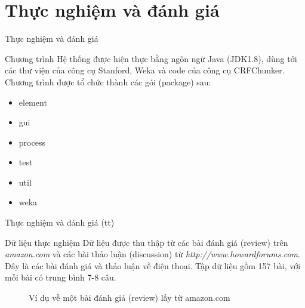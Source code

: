 \documentclass{beamer}
\begin{document}
	\section{Thực nghiệm và đánh giá}		
		\begin{frame}{Thực nghiệm và đánh giá}			
			\begin{block}{Chương trình}
				Hệ thống được hiện thực bằng ngôn ngữ Java (JDK1.8), dùng tới các thư viện của công cụ Stanford, Weka và code của công cụ CRFChunker. Chương trình được tổ chức thành các gói (package) sau:
				\begin{itemize}
					\item{element}
					\item{gui}
					\item{process}
					\item{test}
					\item{util}
					\item{weka}						
				\end{itemize}
			\end{block}
		\end{frame}	

		\begin{frame}{Thực nghiệm và đánh giá (tt)}			
			\begin{block}{Dữ liệu thực nghiệm}
				Dữ liệu được thu thập từ các bài đánh giá (review) trên \textit{amazon.com} và các bài thảo luận (discussion) từ \textit{http://www.howardforums.com}. Đây là các bài đánh giá và thảo luận về điện thoại. Tập dữ liệu gồm 157 bài, với mỗi bài có trung bình 7-8 câu.
			\end{block}
			\begin{figure}[H]
				\centering				
				\noindent{}
				\caption{Ví dụ về một bài đánh giá (review) lấy từ amazon.com}				
			\end{figure}
		\end{frame}		
\end{document}
